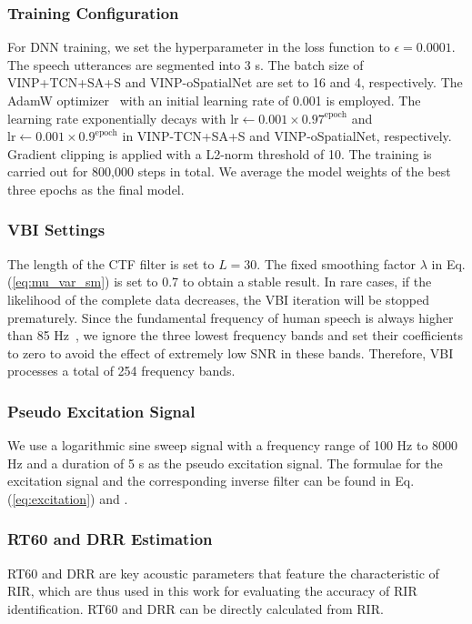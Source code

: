 \subsubsection{Training Configuration}
For DNN training, we set the hyperparameter in the loss function to $\epsilon=0.0001$.
The speech utterances are segmented into 3 s.
The batch size of VINP+TCN+SA+S and VINP-oSpatialNet are set to 16 and 4, respectively.
The AdamW optimizer~\cite{loshchilov2017decoupled} with an initial learning rate of 0.001 is employed.
The learning rate exponentially decays with $\mathrm{lr} \leftarrow{} 0.001\times0.97^{\mathrm{epoch}}$ and $\mathrm{lr} \leftarrow{} 0.001\times0.9^{\mathrm{epoch}}$ in VINP-TCN+SA+S and VINP-oSpatialNet, respectively.
Gradient clipping is applied with a L2-norm threshold of 10.
The training is carried out for 800,000 steps in total.
We average the model weights of the best three epochs as the final model.

\subsubsection{VBI Settings}
The length of the CTF filter is set to $L=30$. The fixed smoothing factor $\lambda$ in Eq. (\ref{eq:mu_var_sm}) is set to 0.7 to obtain a stable result.
In rare cases, if the likelihood of the complete data decreases, the VBI iteration will be stopped prematurely.
Since the fundamental frequency of human speech is always higher than 85 Hz~\cite{howard2007voice}, we ignore the three lowest frequency bands and set their coefficients to zero to avoid the effect of extremely low SNR in these bands. 
Therefore, VBI processes a total of 254 frequency bands.


\subsubsection{Pseudo Excitation Signal}
We use a logarithmic sine sweep signal with a frequency range of 100 Hz to 8000 Hz and a duration of 5 s as the pseudo excitation signal.
The formulae for the excitation signal and the corresponding inverse filter can be found in Eq. (\ref{eq:excitation}) and \cite{stan2002comparison,farina2000simultaneous}.

\subsubsection{RT60 and DRR Estimation}
RT60 and DRR are key acoustic parameters that feature the characteristic of RIR, which are thus used in this work for evaluating the accuracy of RIR identification. RT60 and DRR can be directly calculated from RIR.

